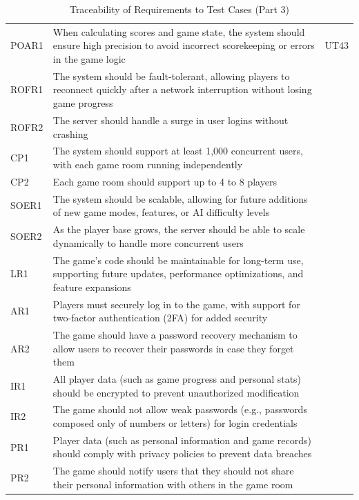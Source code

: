 \documentclass[12pt, titlepage]{article}
\begin{document}
\begin{table}[H]
    \centering
    \begin{tabularx}{\textwidth}{|l|X|l|}
        \hline
        POAR1 & When calculating scores and game state, the system should ensure high precision to avoid incorrect scorekeeping or errors in the game logic & UT43 \\
        ROFR1 & The system should be fault-tolerant, allowing players to reconnect quickly after a network interruption without losing game progress &  \\
        ROFR2 & The server should handle a surge in user logins without crashing &  \\
        CP1 & The system should support at least 1,000 concurrent users, with each game room running independently &  \\
        CP2 & Each game room should support up to 4 to 8 players &  \\
        SOER1 & The system should be scalable, allowing for future additions of new game modes, features, or AI difficulty levels &  \\
        SOER2 & As the player base grows, the server should be able to scale dynamically to handle more concurrent users &  \\
        LR1 & The game’s code should be maintainable for long-term use, supporting future updates, performance optimizations, and feature expansions &  \\
        AR1 & Players must securely log in to the game, with support for two-factor authentication (2FA) for added security &  \\
        AR2 & The game should have a password recovery mechanism to allow users to recover their passwords in case they forget them &  \\
        IR1 & All player data (such as game progress and personal stats) should be encrypted to prevent unauthorized modification &  \\
        IR2 & The game should not allow weak passwords (e.g., passwords composed only of numbers or letters) for login credentials &  \\
        PR1 & Player data (such as personal information and game records) should comply with privacy policies to prevent data breaches &  \\
        PR2 & The game should notify users that they should not share their personal information with others in the game room &  \\
        \hline
    \end{tabularx}
    \caption{Traceability of Requirements to Test Cases (Part 3)}
    \label{tab:trace_requirements_3}
\end{table}
\end{document}
